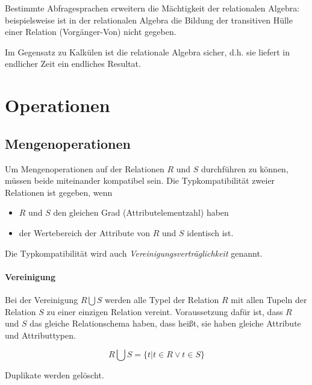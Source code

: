 \documentclass{scrbook}
\begin{document}
Bestimmte Abfragesprachen erweitern die Mächtigkeit der relationalen Algebra:
beispielsweise ist in der relationalen Algebra die Bildung der transitiven Hülle
einer Relation (Vorgänger-Von) nicht gegeben.

Im Gegensatz zu Kalkülen ist die relationale Algebra sicher, d.h.
sie liefert in endlicher Zeit ein endliches Resultat.


\section{Operationen}

\subsection{Mengenoperationen}

Um Mengenoperationen auf der Relationen $R$ und $S$ durchführen zu können,
müssen beide miteinander kompatibel sein.
Die Typkompatibilität zweier Relationen ist gegeben, wenn
\begin{itemize}
\item $R$ und $S$ den gleichen Grad (Attributelementzahl) haben
\item der Wertebereich der Attribute von $R$ und $S$ identisch ist.
\end{itemize}

Die Typkompatibilität wird auch \emph{Vereinigungsverträglichkeit} genannt.

\paragraph{Vereinigung}

Bei der Vereinigung $R ⋃ S$ werden alle Typel der Relation $R$ 
mit allen Tupeln der Relation $S$ zu einer einzigen Relation vereint.
Voraussetzung dafür ist, dass $R$ und $S$ das gleiche Relationschema haben,
dass heißt, sie haben gleiche Attribute und Attributtypen.

\begin{definition}[Vereinigung]
\begin{displaymath}
R ⋃ S = \{t | t ∈ R ∨ t ∈ S \}
\end{displaymath}
\end{definition}

Duplikate werden gelöscht.

% 
% 
% 
%
\end{document}
